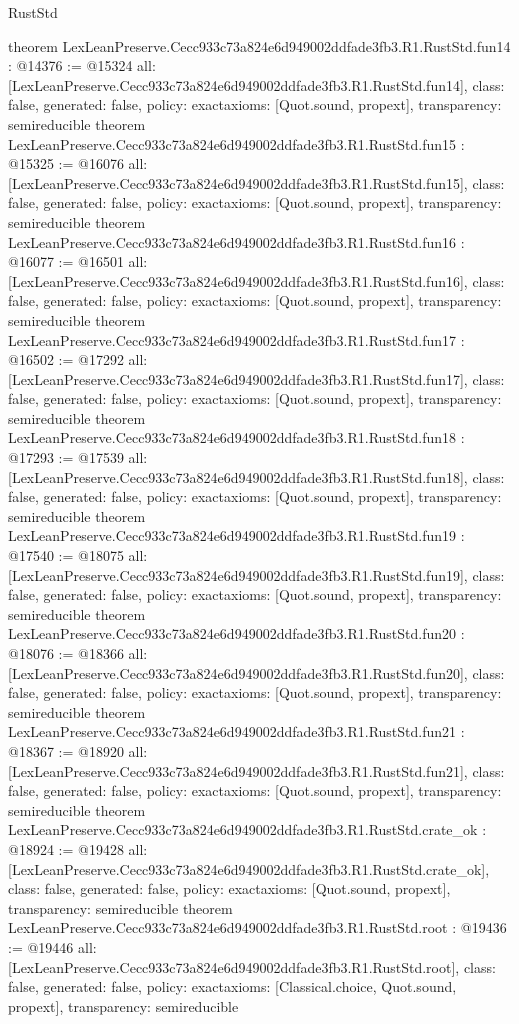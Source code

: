 \begin{lexlean}{RustStd}
\begin{coremodule}
{}
theorem LexLeanPreserve.Cecc933c73a824e6d949002ddfade3fb3.R1.RustStd.fun14 : @14376 := @15324 {
  all: [LexLeanPreserve.Cecc933c73a824e6d949002ddfade3fb3.R1.RustStd.fun14],
  class: false,
  generated: false,
  policy: exact{axioms: [Quot.sound, propext]},
  transparency: semireducible
}
theorem LexLeanPreserve.Cecc933c73a824e6d949002ddfade3fb3.R1.RustStd.fun15 : @15325 := @16076 {
  all: [LexLeanPreserve.Cecc933c73a824e6d949002ddfade3fb3.R1.RustStd.fun15],
  class: false,
  generated: false,
  policy: exact{axioms: [Quot.sound, propext]},
  transparency: semireducible
}
theorem LexLeanPreserve.Cecc933c73a824e6d949002ddfade3fb3.R1.RustStd.fun16 : @16077 := @16501 {
  all: [LexLeanPreserve.Cecc933c73a824e6d949002ddfade3fb3.R1.RustStd.fun16],
  class: false,
  generated: false,
  policy: exact{axioms: [Quot.sound, propext]},
  transparency: semireducible
}
theorem LexLeanPreserve.Cecc933c73a824e6d949002ddfade3fb3.R1.RustStd.fun17 : @16502 := @17292 {
  all: [LexLeanPreserve.Cecc933c73a824e6d949002ddfade3fb3.R1.RustStd.fun17],
  class: false,
  generated: false,
  policy: exact{axioms: [Quot.sound, propext]},
  transparency: semireducible
}
theorem LexLeanPreserve.Cecc933c73a824e6d949002ddfade3fb3.R1.RustStd.fun18 : @17293 := @17539 {
  all: [LexLeanPreserve.Cecc933c73a824e6d949002ddfade3fb3.R1.RustStd.fun18],
  class: false,
  generated: false,
  policy: exact{axioms: [Quot.sound, propext]},
  transparency: semireducible
}
theorem LexLeanPreserve.Cecc933c73a824e6d949002ddfade3fb3.R1.RustStd.fun19 : @17540 := @18075 {
  all: [LexLeanPreserve.Cecc933c73a824e6d949002ddfade3fb3.R1.RustStd.fun19],
  class: false,
  generated: false,
  policy: exact{axioms: [Quot.sound, propext]},
  transparency: semireducible
}
theorem LexLeanPreserve.Cecc933c73a824e6d949002ddfade3fb3.R1.RustStd.fun20 : @18076 := @18366 {
  all: [LexLeanPreserve.Cecc933c73a824e6d949002ddfade3fb3.R1.RustStd.fun20],
  class: false,
  generated: false,
  policy: exact{axioms: [Quot.sound, propext]},
  transparency: semireducible
}
theorem LexLeanPreserve.Cecc933c73a824e6d949002ddfade3fb3.R1.RustStd.fun21 : @18367 := @18920 {
  all: [LexLeanPreserve.Cecc933c73a824e6d949002ddfade3fb3.R1.RustStd.fun21],
  class: false,
  generated: false,
  policy: exact{axioms: [Quot.sound, propext]},
  transparency: semireducible
}
theorem LexLeanPreserve.Cecc933c73a824e6d949002ddfade3fb3.R1.RustStd.crate_ok : @18924 := @19428 {
  all: [LexLeanPreserve.Cecc933c73a824e6d949002ddfade3fb3.R1.RustStd.crate_ok],
  class: false,
  generated: false,
  policy: exact{axioms: [Quot.sound, propext]},
  transparency: semireducible
}
theorem LexLeanPreserve.Cecc933c73a824e6d949002ddfade3fb3.R1.RustStd.root : @19436 := @19446 {
  all: [LexLeanPreserve.Cecc933c73a824e6d949002ddfade3fb3.R1.RustStd.root],
  class: false,
  generated: false,
  policy: exact{axioms: [Classical.choice, Quot.sound, propext]},
  transparency: semireducible
}


\end{coremodule}
\end{lexlean}

